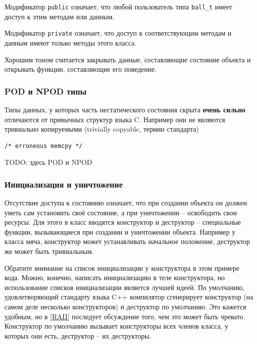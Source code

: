 \documentclass[a4paper,12pt,oneside]{article}
\begin{document}


Модификатор \lstinline!public! означает, что любой пользователь типа \lstinline!ball_t! имеет доступ к этим методам или данным. 

Модификатор \lstinline!private! означает, что доступ к соответствующим методам и данным имеют только методы этого класса.



Хорошим тоном считается закрывать данные, составляющие состояние объекта и открывать функции, составляющие его поведение.

\subsubsection{POD и NPOD типы}\label{PodNpod}

Типы данных, у которых часть нестатического состояния скрыта \textbf{очень сильно} отличаются от привычных структур языка C. Например они не являются тривиально копируемыми (trivially copyable, термин стандарта)

\begin{lstlisting}
/* erroneous memcpy */
\end{lstlisting}

TODO: здесь POD и NPOD

\subsubsection{Инициализация и уничтожение}\label{ConstrDestr}

Отсутствие доступа к состоянию означает, что при создании объекта он должен уметь сам установить своё состояние, а при уничтожении – освободить свои ресурсы. Для этого в класс вводятся конструктор и деструктор – специальные функции, вызывающиеся при создании и уничтожении объекта. Например у класса мяча, конструктор может устанавливать начальное положение, деструктор же может быть тривиальным.



Обратите внимание на список инициализации у конструктора в этом примере кода. Можно, конечно, написать инициализацию в теле конструктора, но использование списков инициализации является лучшей идеей. По умолчанию, удовлетворяющий стандарту языка C++ компилятор сгенерирует конструктор (на самом деле несколько конструкторов) и деструктор по умолчанию. Это кажется удобным, но в \ref{RAII} последует обсуждение того, чем это может быть чревато. Конструктор по умолчанию вызывает конструкторы всех членов класса, у которых они есть, деструктор -- их деструкторы.
\end{document}
